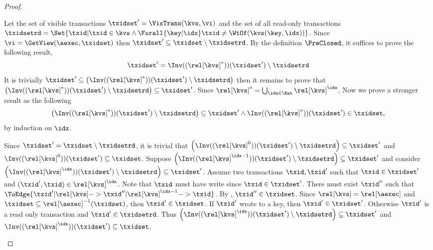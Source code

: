 \begin{proof}
\begin{enumerate}
    Let the set of visible transactions \( \txidset' = \VisTrans(\kvs,\vi) \)
    and the set of all read-only transactions 
    \( \txidsetrd = \Set{\txid | \txid \in \kvs \land \Forall{\key | \idx} \txid \neq \WtOf(\kvs(\key,\idx))} \).
    Since \( \vi = \GetView(\aexec,\txidset) \) then \( \txidset' \subseteq \txidset \setminus \txidsetrd \).
    By the definition \( \PreClosed \), it suffices to prove the following result,
    \[
        \txidset' =  \Inv((\rel[\kvs]^*))(\txidset') \setminus \txidsetrd 
    \]
    It is trivially \( \txidset' \subseteq \left( \Inv((\rel[\kvs]^{*}))(\txidset') \setminus \txidsetrd \right) \)
    then it remains to prove that 
    \( \left( \Inv((\rel[\kvs]^{*}))(\txidset') \setminus \txidsetrd \right) \subseteq \txidset' \).
    Since \( \rel[\kvs]^{*} = \bigcup_{\idx \in \Nat} \rel[\kvs]^{\idx} \),
    Now we prove a stronger result as the following
    \[
        \left( \Inv((\rel[\kvs]^*))(\txidset') \setminus \txidsetrd \right) \subseteq \txidset' 
        \land \Inv((\rel[\kvs]^*))(\txidset') \in \txidset ,
    \]
    by induction on \( \idx \).
    \begin{enumerate}
    Since \( \txidset' = \txidset \setminus \txidsetrd \),
    it is trivial that 
    \( \left( \Inv((\rel[\kvs]^{0}))(\txidset') \setminus \txidsetrd \right) \subseteq \txidset' \)
    and \( \Inv((\rel[\kvs]^{0}))(\txidset') \subseteq \txidset \).
    Suppose \( \left( \Inv((\rel[\kvs]^{\idx - 1}))(\txidset') \setminus \txidsetrd \right) \subseteq \txidset' \)
    and consider \( \left( \Inv((\rel[\kvs]^{\idx}))(\txidset') \setminus \txidsetrd \right) \subseteq \txidset' \).
    Assume two transactions \( \txid, \txid' \)  such that \( \txid \in \txidset' \)
    and \( (\txid',\txid) \in \rel[\kvs]^{\idx} \).
    Note that \( \txid \) must have write since \( \txid \in \txidset' \).
    There must exist \( \txid'' \) such that \( \ToEdge{\txid' | \rel[\kvs] 
                    -> \txid'' | \rel[\kvs]^{\idx - 1} -> \txid } \).
    By \ih, \( \txid'' \in \txidset \).
    Since \( \rel[\kvs] = \rel[\aexec] \) and \( \txidset \subseteq \rel[\aexec]^{-1}(\txidset) \),
    then \( \txid' \in \txidset \).
    If \( \txid' \) wrote to a key, then \( \txid' \in \txidset' \).
    Otherwise \( \txid' \) is a read only transaction and \( \txid' \in \txidsetrd \).
    Thus \( \left( \Inv((\rel[\kvs]^{\idx}))(\txidset') \setminus \txidsetrd \right) \subseteq \txidset' \)
    and \( \Inv((\rel[\kvs]^{\idx}))(\txidset') \subseteq \txidset \). \qedhere
    \end{enumerate}


\end{enumerate}
\end{proof}
